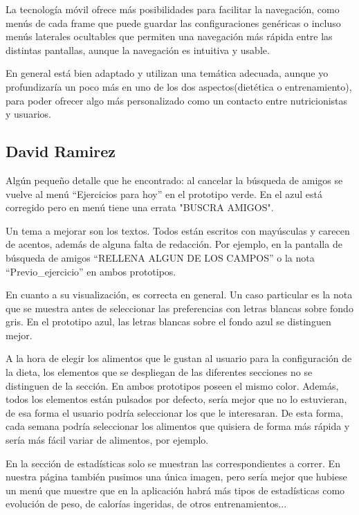 \documentclass[a4paper]{article}
\begin{document}
La tecnología móvil ofrece más posibilidades para facilitar la navegación, como
menús de cada frame que puede guardar las configuraciones genéricas o incluso
menús laterales ocultables que permiten una navegación más rápida entre las
distintas pantallas, aunque la navegación es intuitiva y usable.

En general está bien adaptado y utilizan una temática adecuada, aunque yo
profundizaría un poco más en uno de los dos aspectos(dietética o entrenamiento),
para poder ofrecer algo más personalizado como un contacto entre nutricionistas
y usuarios.


\subsection{David Ramirez}

Algún pequeño detalle que he encontrado: al cancelar la búsqueda de amigos se vuelve al menú ``Ejercicios para hoy'' en el prototipo verde. En el azul está corregido pero en menú tiene una errata "BUSCRA AMIGOS".

Un tema a mejorar son los textos. Todos están escritos con mayúsculas y carecen de acentos, además de alguna falta de redacción. Por ejemplo, en la pantalla de búsqueda de amigos ``RELLENA ALGUN DE LOS CAMPOS'' o la nota ``Previo\_ejercicio'' en ambos prototipos.

En cuanto a su visualización, es correcta en general. Un caso particular es la nota que se muestra antes de seleccionar las preferencias con letras blancas sobre fondo gris. En el prototipo azul, las letras blancas sobre el fondo azul se distinguen mejor.

A la hora de elegir los alimentos que le gustan al usuario para la configuración de la dieta, los elementos que se despliegan de las diferentes secciones no se distinguen de la sección. En ambos prototipos poseen el mismo color. Además, todos los elementos están pulsados por defecto, sería mejor que no lo estuvieran, de esa forma el usuario podría seleccionar los que le interesaran. De esta forma, cada semana podría seleccionar los alimentos que quisiera de forma más rápida y sería más fácil variar de alimentos, por ejemplo.

En la sección de estadísticas solo se muestran las correspondientes a correr. En nuestra página también pusimos una única imagen, pero sería mejor que hubiese un menú que muestre que en la aplicación habrá más tipos de estadísticas como evolución de peso, de calorías ingeridas, de otros entrenamientos...
\end{document}
